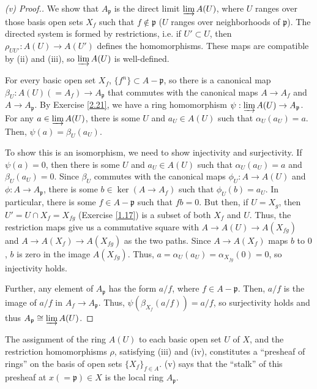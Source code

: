\begin{proof}[(v) Proof.]
We show that $A_{\mathfrak{p}}$ is the direct limit $\varinjlim A(U)$, where $U$ ranges over those basis open sets $X_f$ such that $f \not\in \mathfrak{p}$ ($U$ ranges over neighborhoods of
$\mathfrak{p}$). The directed system is formed by restrictions, i.e. if $U' \subset U$, then $\rho_{UU'} : A(U) \to A(U')$ defines the homomorphisms. These maps are compatible by (ii) and (iii), so $\varinjlim A(U)$ is well-defined.

For every basic open set $X_f$, $\{f^n\} \subset A-\mathfrak{p}$, so there is a canonical map $\beta_U : A(U)(=A_f)\to A_{\mathfrak{p}}$ that commutes with the canonical maps $A \to A_f$ and $A \to A_{\mathfrak{p}}$.
By Exercise \ref{2.21}, we have a ring homomorphism $\psi: \varinjlim A(U) \to A_{\mathfrak{p}}$. For any $a \in \varinjlim A(U)$, there is some $U$ and $a_U \in A(U)$ such that $\alpha_U(a_U) = a$. Then,
$\psi(a) = \beta_U(a_U)$. 

To show this is an isomorphism, we need to show injectivity and surjectivity. If $\psi(a) = 0$, then there is some $U$ and $a_U \in A(U)$ such that $\alpha_U(a_U) = a$ and $\beta_U(a_U) = 0$. Since
$\beta_U$ commutes with the canonical maps $\phi_U : A \to A(U)$ and $\phi : A \to A_{\mathfrak{p}}$, there is some $b \in \ker(A \to A_f)$ such that $\phi_U(b) = a_U$. 
In particular, there is some $f \in A - \mathfrak{p}$ such that $f b = 0$. But then, if $U = X_g$, then $U' = U \cap X_f = X_{fg}$ (Exercise \ref{1.17}) is a subset of both $X_f$ and $U$. Thus, the restriction maps give us
a commutative square with $A \to A(U) \to A(X_{fg})$ and $A \to A(X_f) \to A(X_{fg})$ as the two paths. Since $A \to A(X_f)$ maps $b$ to $0$, $b$ is zero in the image $A(X_{fg})$. Thus, $a = \alpha_U(a_U) = \alpha_{X_{fg}}(0) = 0$, 
so injectivity holds. 

Further, any element of $A_{\mathfrak{p}}$ has the form $a/f$, where $f \in A-\mathfrak{p}$. Then, $a/f$ is the image of $a/f$ in $A_f \to A_{\mathfrak{p}}$. Thus, $\psi(\beta_{X_f}(a/f)) = a/f$, so surjectivity holds 
and thus $A_{\mathfrak{p}} \cong \varinjlim A(U)$.
\end{proof}

\begin{remark}
The assignment of the ring $A(U)$ to each basic open set $U$ of $X$, and the restriction homomorphisms $\rho$, satisfying (iii) and (iv), constitutes a ``presheaf of rings'' on the basis of open sets $\{X_f\}_{f \in A}$. (v)
says that the ``stalk'' of this presheaf at $x (=\mathfrak{p}) \in X$ is the local ring $A_{\mathfrak{p}}$.
\end{remark}

